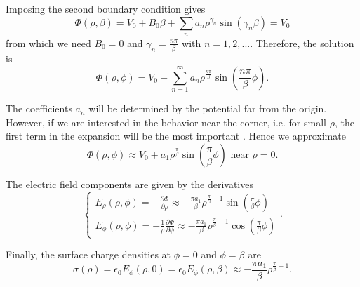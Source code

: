 \begin{enumerate}
Imposing the second boundary condition gives
\begin{equation}
\Phi (\rho, \beta) = V_0  + B_0  \beta  + \sum_n a_n \rho^{\gamma_n}  \sin (\gamma_n \beta )= V_0
\end{equation}
from which we need $B_0 = 0$ and $\gamma_n = \frac{n\pi}{\beta}$ with $n=1,2,...$. Therefore, the solution is	
\begin{equation}
\Phi (\rho, \phi) = V_0  + \sum_{n=1}^\infty a_n \rho^{\frac{n\pi}{\beta}}  \sin \left(\frac{n\pi}{\beta} \phi \right).
\end{equation}

The coefficients $a_n$ will be determined by the potential far from the origin. However, if we are interested in the behavior near the corner, i.e. for small $\rho$, the first term in the expansion will be the most important . Hence we approximate
\begin{equation}
\Phi (\rho, \phi) \approx V_0  + a_1 \rho^{\frac{\pi}{\beta}}  \sin \left(\frac{\pi}{\beta} \phi \right) \text{  near } \rho=0.
\end{equation}

The electric field components are given by the derivatives
\begin{equation}
\begin{cases}
E_\rho (\rho, \phi) = -\frac{\partial \Phi}{\partial \rho} \approx -\frac{\pi a_1}{\beta} \rho^{\frac{\pi}{\beta} - 1} \sin \left(\frac{\pi}{\beta} \phi \right) \\
E_\phi (\rho, \phi) = - \frac{1}{\rho}\frac{\partial \Phi}{\partial \phi} \approx -\frac{\pi a_1}{\beta} \rho^{\frac{\pi}{\beta} -1 } \cos \left(\frac{\pi}{\beta} \phi \right)
\end{cases} . 
\end{equation}

Finally, the surface charge densities at $\phi=0$ and $\phi=\beta$ are
\begin{equation}
\sigma (\rho) = \epsilon_0 E_\phi (\rho, 0) =  \epsilon_0 E_\phi (\rho, \beta) \approx -\frac{\pi a_1}{\beta} \rho^{\frac{\pi}{\beta} -1 }.
\end{equation}

\end{enumerate}
